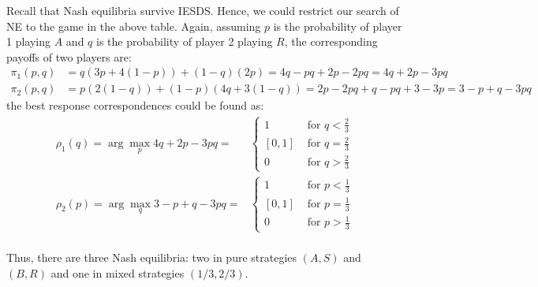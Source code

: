 \documentclass[]{article}
\begin{document}
Recall that Nash equilibria survive IESDS. Hence, we could restrict our search of NE to the game in the above table. Again, assuming $p$ is the probability of player 1 playing $A$ and $q$ is the probability of player 2 playing $R$, the corresponding payoffs of two players are:
\begin{equation}
	\begin{split}
		\pi_1(p, q)& = q(3p + 4(1-p)) + (1-q)(2p) = 4q - pq + 2p - 2pq = 4q + 2p - 3pq\\ \nonumber
		\pi_2(p, q)& = p(2(1-q)) + (1-p)(4q + 3(1-q)) = 2p - 2pq + q - pq + 3 - 3p = 3 - p + q - 3pq
	\end{split}
\end{equation}
the best response correspondences could be found as:
\begin{equation}
	\begin{split}
		\rho_1(q) = \arg\max\limits_{p}4q + 2p - 3pq = &\begin{cases}
		1 &\text{ for }q < \frac{2}{3} \\
		[0, 1] &\text{ for }q = \frac{2}{3} \\
		0 &\text{ for }q > \frac{2}{3}
		\end{cases}\\ \nonumber
		\rho_2(p) = \arg\max\limits_{q}3 - p + q - 3pq = &\begin{cases}
		1 &\text{ for }p < \frac{1}{3} \\
		[0, 1] &\text{ for }p = \frac{1}{3} \\
		0 &\text{ for }p > \frac{1}{3}
		\end{cases}\\		
	\end{split}
\end{equation}

Thus, there are three Nash equilibria: two in pure strategies $(A, S)$ and $(B, R)$ and one in mixed strategies $(1/3, 2/3)$.
\\
\begin{figure}[h]
	\centering
\end{figure}
\end{document}
